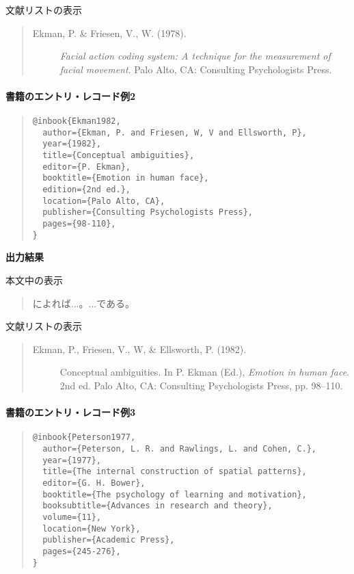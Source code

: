 \documentclass[12pt]{ltjsarticle}
\begin{document}
文献リストの表示
\begin{quote}
\begin{description}
  \item[\textrm{Ekman, P. \& Friesen, V., W. (1978).}]\textit{Facial action coding system: A technique for the measurement of facial movement}. Palo Alto, CA: Consulting Psychologists Press.
\end{description}
\end{quote}


\paragraph{書籍のエントリ・レコード例2}

\begin{quote}
\begin{verbatim}
@inbook{Ekman1982,
  author={Ekman, P. and Friesen, W, V and Ellsworth, P},
  year={1982},
  title={Conceptual ambiguities},
  editor={P. Ekman},
  booktitle={Emotion in human face},
  edition={2nd ed.},
  location={Palo Alto, CA},
  publisher={Consulting Psychologists Press},
  pages={98-110},
}
\end{verbatim}
\end{quote}

\textbf{出力結果}

本文中の表示
\begin{quote}
\textcite{Ekman1982}によれば...。...である\parencite{Ekman1982}。
\end{quote}

文献リストの表示
\begin{quote}
\begin{description}
  \item[\textrm{Ekman, P., Friesen, V., W, \& Ellsworth, P. (1982).}]Conceptual ambiguities. In P. Ekman (Ed.), \textit{Emotion in human face}. 2nd ed. Palo Alto, CA: Consulting Psychologists Press, pp. 98--110.
\end{description}
\end{quote}


\paragraph{書籍のエントリ・レコード例3}

\begin{quote}
\begin{verbatim}
@inbook{Peterson1977,
  author={Peterson, L. R. and Rawlings, L. and Cohen, C.},
  year={1977},
  title={The internal construction of spatial patterns},
  editor={G. H. Bower},
  booktitle={The psychology of learning and motivation},
  booksubtitle={Advances in research and theory},
  volume={11},
  location={New York},
  publisher={Academic Press},
  pages={245-276},
}
\end{verbatim}
\end{quote}
\end{document}
